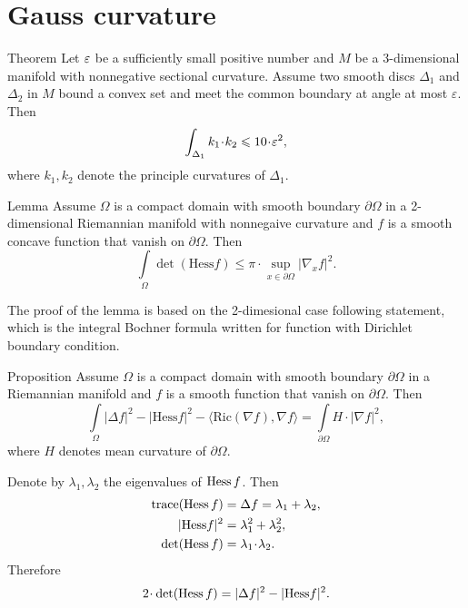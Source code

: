 \section{Gauss curvature}
\label{sec:gauss}

\begin{thm}{Theorem}\label{thm:lens}
Let $\varepsilon$ be a sufficiently small positive number and 
$M$ be a 3-dimensional manifold with nonnegative sectional curvature.
Assume two smooth discs $\Delta_1$ and $\Delta_2$ in $M$ bound a convex set and meet the common boundary at angle at most $\varepsilon$.
Then 
\[\int_{\Delta_1}k_1\cdot k_2\le 10\cdot \eps^2,\]
where $k_1,k_2$ denote the principle curvatures of $\Delta_1$.
\end{thm}

\begin{thm}{Lemma}\label{lem:bochner}
Assume $\Omega$ is a compact domain with smooth boundary $\partial \Omega$ in a 2-dimensional Riemannian manifold with nonnegaive curvature
and $f$ is a smooth concave function that vanish on $\partial \Omega$.
Then
\[\int\limits_\Omega 
\det(\mathrm{Hess}f)
\le\pi\cdot\sup_{x\in\partial\Omega}|\nabla_x f|^2.\]

\end{thm}

The proof of the lemma is based on the 2-dimesional case  following statement,
which is the integral Bochner formula written for function with Dirichlet boundary condition.

\begin{thm}{Proposition}\label{prop:bochner-dirichle}
Assume $\Omega$ is a compact domain with smooth boundary $\partial \Omega$ in a Riemannian manifold
and $f$ is a smooth function that vanish on $\partial \Omega$.
Then
\[\int\limits_\Omega |\Delta f|^2
-|\mathrm{Hess}f|^2
-\langle\mathrm{Ric}(\nabla f),\nabla f\rangle
=\int\limits_{\partial\Omega}
H\cdot|\nabla f|^2,\]
where $H$ denotes mean curvature of $\partial \Omega$.
\end{thm}

Denote by  $\lambda_1,\lambda_2$ the eigenvalues of  $\operatorname{Hess} f$.
Then
\begin{align*}
\trace(\Hess f)&=\Delta f=\lambda_1+\lambda_2,
\\
|\mathrm{Hess}f|^2&=\lambda_1^2+\lambda_2^2,
\\
\det(\Hess f)&=\lambda_1\cdot\lambda_2.
\end{align*}
Therefore 
\[2\cdot\det(\Hess f)
=|\Delta f|^2
-|\mathrm{Hess}f|^2.\] 

